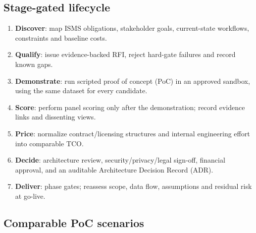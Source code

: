 \documentclass[10pt,letterpaper]{article}
\begin{document}
\subsection{Stage-gated lifecycle}
\begin{enumerate}
\item \textbf{Discover}: map ISMS obligations, stakeholder goals, current-state workflows, constraints and baseline costs.
\item \textbf{Qualify}: issue evidence-backed RFI, reject hard-gate failures and record known gaps.
\item \textbf{Demonstrate}: run scripted proof of concept (PoC) in an approved sandbox, using the same dataset for every candidate.
\item \textbf{Score}: perform panel scoring only after the demonstration; record evidence links and dissenting views.
\item \textbf{Price}: normalize contract/licensing structures and internal engineering effort into comparable TCO.
\item \textbf{Decide}: architecture review, security/privacy/legal sign-off, financial approval, and an auditable Architecture Decision Record (ADR).
\item \textbf{Deliver}: phase gates; reassess scope, data flow, assumptions and residual risk at go-live.
\end{enumerate}

\subsection{Comparable PoC scenarios}
\small
\end{document}

